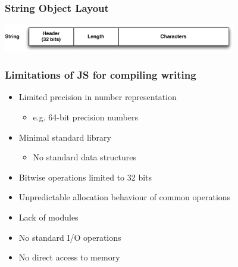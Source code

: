 \begin{frame}
\frametitle{\bf String Object Layout}

\begin{center}
\includegraphics[width=4in]{images/obj_layout_str}
\end{center}
\end{frame}

% 

% 

\begin{frame}
\frametitle{\bf Limitations of JS for compiling writing}

    \begin{itemize}
        \item Limited precision in number representation
        \begin{itemize}
            \item e.g. 64-bit precision numbers
        \end{itemize}
        \item Minimal standard library
        \begin{itemize}
            \item No standard data structures
        \end{itemize}
        \item Bitwise operations limited to 32 bits
        \item Unpredictable allocation behaviour of common operations
        \item Lack of modules
        \item No standard I/O operations
        \item No direct access to memory
    \end{itemize}
\end{frame}

